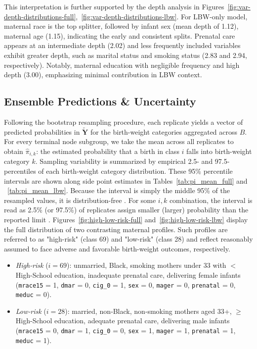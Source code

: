 This interpretation is further supported by the depth analysis in Figures~\ref{fig:var-depth-distributions-full},~\ref{fig:var-depth-distributions-lbw}. For LBW-only model, maternal race is the top splitter, followed by infant sex (mean depth of 1.12), maternal age (1.15), indicating the early and consistent splits. Prenatal care appears at an intermediate depth (2.02) and less frequently included variables exhibit greater depth, such as marital status and smoking status (2.83 and 2.94, respectively). Notably, maternal education with negligible frequency and high depth (3.00), emphasizing minimal contribution in LBW context. 


\subsection{Ensemble Predictions \& Uncertainty}
\label{sec:ch3-boot-pred}

Following the bootstrap resampling procedure, each replicate yields a vector of predicted probabilities in \(\tilde{\mathbf{Y}}\) for the birth-weight categories aggregated across \(B\). For every terminal node subgroup, we take the mean across all replicates to obtain \(\hat{\pi}_{i,k}\): the estimated probability that a birth in class \(i\) falls into birth-weight category \(k\). Sampling variability is summarized by empirical 2.5- and 97.5-percentiles of each birth-weight category distribution. These 95\% percentile intervals are shown along side point estimates in Tables~\ref{tab:pi_mean_full} and ~\ref{tab:pi_mean_lbw}. Because the interval is simply the middle 95\% of the resampled values, it is distribution-free \parencite{percentile-interval}.  For some \(i,k\) combination, the interval is read as 2.5\% (or 97.5\%) of replicates assign smaller (larger) probability than the reported limit \parencite{percentile-interval}. Figures~\ref{fig:high-low-risk-full} and~\ref{fig:high-low-risk-lbw} display the full distribution of two contrasting maternal profiles.  Such profiles are referred to as "high-risk" (class 69) and "low-risk" (class 28) and reflect reasonably assumed to face adverse and favorable birth-weight outcomes, respectively.

\begin{itemize}
  \item \emph{High‑risk} (\(i=69\)): unmarried, Black, smoking mothers under 33 with $<$ High-School education, inadequate prenatal care, delivering female infants (\texttt{mrace15} = 1, \texttt{dmar} = 0, \texttt{cig\_0} = 1, \texttt{sex} = 0, \texttt{mager} = 0, \texttt{prenatal} = 0, \texttt{meduc} = 0).
  \item \emph{Low‑risk} (\(i=28\)): married, non‑Black, non‑smoking mothers aged 33+, $\geq$ High-School education, adequate prenatal care, delivering male infants (\texttt{mrace15} = 0, \texttt{dmar} = 1, \texttt{cig\_0} = 0, \texttt{sex} = 1, \texttt{mager} = 1, \texttt{prenatal} = 1, \texttt{meduc} = 1).
\end{itemize}


